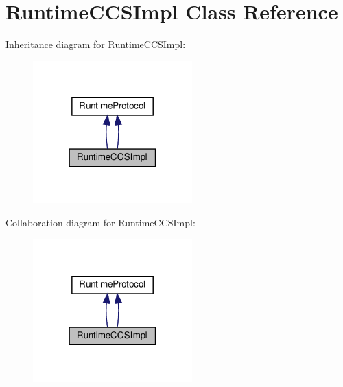\hypertarget{classRuntimeCCSImpl}{}\section{Runtime\+C\+C\+S\+Impl Class Reference}
\label{classRuntimeCCSImpl}


Inheritance diagram for Runtime\+C\+C\+S\+Impl\+:
\nopagebreak
\begin{figure}[H]
\begin{center}
\leavevmode
\includegraphics[width=174pt]{classRuntimeCCSImpl__inherit__graph}
\end{center}
\end{figure}


Collaboration diagram for Runtime\+C\+C\+S\+Impl\+:
\nopagebreak
\begin{figure}[H]
\begin{center}
\leavevmode
\includegraphics[width=174pt]{classRuntimeCCSImpl__coll__graph}
\end{center}
\end{figure}
